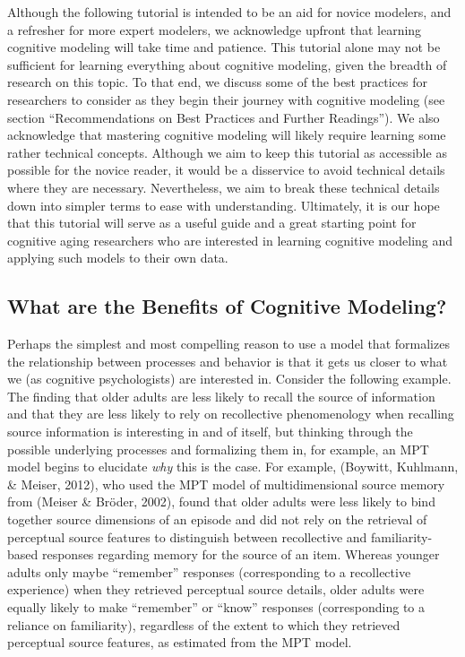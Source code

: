 \documentclass[
  english,
  ,man,floatsintext]{apa6}
\begin{document}
Although the following tutorial is intended to be an aid for novice modelers, and a refresher for more expert modelers, we acknowledge upfront that learning cognitive modeling will take time and patience. This tutorial alone may not be sufficient for learning everything about cognitive modeling, given the breadth of research on this topic. To that end, we discuss some of the best practices for researchers to consider as they begin their journey with cognitive modeling (see section \enquote{Recommendations on Best Practices and Further Readings}). We also acknowledge that mastering cognitive modeling will likely require learning some rather technical concepts. Although we aim to keep this tutorial as accessible as possible for the novice reader, it would be a disservice to avoid technical details where they are necessary. Nevertheless, we aim to break these technical details down into simpler terms to ease with understanding. Ultimately, it is our hope that this tutorial will serve as a useful guide and a great starting point for cognitive aging researchers who are interested in learning cognitive modeling and applying such models to their own data.

\hypertarget{what-are-the-benefits-of-cognitive-modeling}{%
\subsection{What are the Benefits of Cognitive Modeling?}\label{what-are-the-benefits-of-cognitive-modeling}}

Perhaps the simplest and most compelling reason to use a model that formalizes the relationship between processes and behavior is that it gets us closer to what we (as cognitive psychologists) are interested in. Consider the following example. The finding that older adults are less likely to recall the source of information and that they are less likely to rely on recollective phenomenology when recalling source information is interesting in and of itself, but thinking through the possible underlying processes and formalizing them in, for example, an MPT model begins to elucidate \emph{why} this is the case. For example, (Boywitt, Kuhlmann, \& Meiser, 2012), who used the MPT model of multidimensional source memory from (Meiser \& Bröder, 2002), found that older adults were less likely to bind together source dimensions of an episode and did not rely on the retrieval of perceptual source features to distinguish between recollective and familiarity-based responses regarding memory for the source of an item. Whereas younger adults only maybe \enquote{remember} responses (corresponding to a recollective experience) when they retrieved perceptual source details, older adults were equally likely to make \enquote{remember} or \enquote{know} responses (corresponding to a reliance on familiarity), regardless of the extent to which they retrieved perceptual source features, as estimated from the MPT model.
\end{document}
